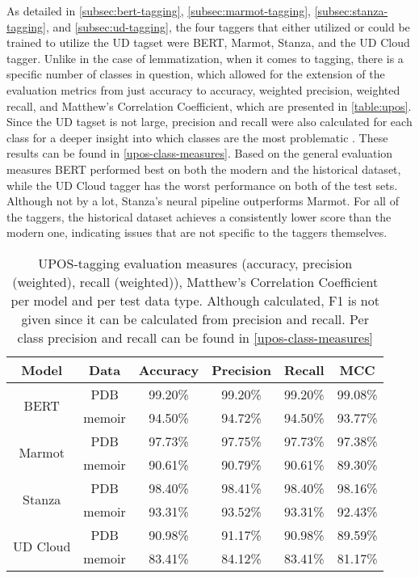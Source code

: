 As detailed in \autoref{subsec:bert-tagging}, \autoref{subsec:marmot-tagging}, \autoref{subsec:stanza-tagging}, and \autoref{subsec:ud-tagging}, the four taggers that either utilized or could be trained to utilize the UD tagset were BERT, Marmot, Stanza, and the UD Cloud tagger. Unlike in the case of lemmatization, when it comes to tagging, there is a specific number of classes in question, which allowed for the extension of the evaluation metrics from just accuracy to accuracy, weighted precision, weighted recall, and Matthew's Correlation Coefficient, which are presented in \autoref{table:upos}. Since the UD tagset is not large, precision and recall were also calculated for each class for a deeper insight into which classes are the most problematic \citep{ud-tagset}. These results can be found in \autoref{upos-class-measures}. Based on the general evaluation measures BERT performed best on both the modern and the historical dataset, while the UD Cloud tagger has the worst performance on both of the test sets. Although not by a lot, Stanza's neural pipeline outperforms Marmot. For all of the taggers, the historical dataset achieves a consistently lower score than the modern one, indicating issues that are not specific to the taggers themselves. 

\renewcommand{\arraystretch}{1.25}
\begin{table}[H]
\begin{center}
\begin{tabular}{|cc|cccc|}
\hline \bf Model & \bf Data & \bf Accuracy & \bf Precision & \bf Recall & \bf MCC \\ \hline
\multirow{2}{4em}{BERT}
& PDB & 99.20\% & 99.20\% & 99.20\% & 99.08\% \\
& memoir & 94.50\% & 94.72\% & 94.50\% & 93.77\%  \\
\multirow{2}{4em}{Marmot}
& PDB & 97.73\% & 97.75\% & 97.73\% & 97.38\% \\
& memoir & 90.61\% & 90.79\% & 90.61\% & 89.30\% \\
\multirow{2}{4em}{Stanza}
& PDB & 98.40\% & 98.41\% & 98.40\% & 98.16\% \\
& memoir & 93.31\% & 93.52\% & 93.31\% & 92.43\% \\
\multirow{2}{4em}{UD Cloud}
& PDB & 90.98\% & 91.17\% & 90.98\% & 89.59\% \\
& memoir & 83.41\% & 84.12\% & 83.41\% & 81.17\% \\ 
\hline
\end{tabular}
\caption{\label{table:upos} UPOS-tagging evaluation measures (accuracy, precision (weighted), recall (weighted)), Matthew's Correlation Coefficient per model and per test data type. Although calculated, F1 is not given since it can be calculated from precision and recall. Per class precision and recall can be found in \autoref{upos-class-measures}}
\end{center}
\end{table}


